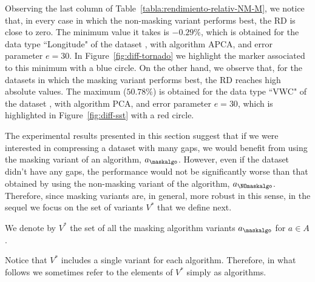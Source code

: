 Observing the last column of Table~\ref{tabla:rendimiento-relativ-NM-M}, we notice that, in every case in which the non-masking variant performs best, the RD is close to zero. The minimum value it takes is $-0.29\%$, which is obtained for the data type ``Longitude" of the dataset \datasettornado, with algorithm APCA, and error parameter $e=30$. In Figure~\ref{fig:diff-tornado} we highlight the marker associated to this minimum with a blue circle. On the other hand, we observe that, for the datasets in which the masking variant performs best, the RD reaches high absolute values. The maximum ($50.78\%$) is obtained for the data type ``VWC" of the dataset \datasetsst, with algorithm PCA, and error parameter $e=30$, which is highlighted in Figure~\ref{fig:diff-sst} with a red circle.


\newcommand{\vaster}{V^*}
The experimental results presented in this section suggest that if we were interested in compressing a dataset with many gaps, we would benefit from using the masking variant of an algorithm, $a_\maskalgo$. However, even if the dataset didn't have any gaps, the performance would not be significantly worse than that obtained by using the non-masking variant of the algorithm, $a_\NOmaskalgo$. Therefore, since masking variants are, in general, more robust in this sense, in the sequel we focus on the set of variants $\vaster$ that we define next.


\vspace{+5pt}
\begin{defcion}
\label{defcion:vaster}
We denote by $\vaster$ the set of all the masking algorithm variants $a_\maskalgo$ for $a \in A$.
\end{defcion}


Notice that $\vaster$ includes a single variant for each algorithm. Therefore, in what follows we sometimes refer to the elements of $\vaster$ simply as algorithms.

